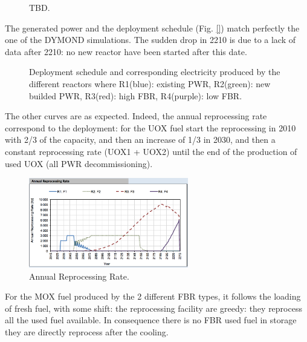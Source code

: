 \documentclass[12pt]{article}
\begin{document}
\begin{figure}[h!]
\centering
{}
\caption{TBD.\label{fig:RessourceUsed} }
\end{figure}

The generated power and the deployment schedule
(Fig. \ref{})  match perfectly the one of the
DYMOND simulations. The sudden drop in 2210 is
due to a lack of data after 2210: no new reactor
have been started after this date.\\

\begin{figure}[h!]
\centering
{}
\caption{Deployment schedule and corresponding
electricity produced by the different reactors
where R1(blue): existing PWR, R2(green): new
builded PWR, R3(red): high FBR, R4(purple): low
FBR.\label{fig:deployment_bis} }
\end{figure}


The other curves are as expected. Indeed, the
annual reprocessing rate correspond to the
deployment:  for the UOX fuel start the
reprocessing in 2010 with 2/3 of the capacity, and
then an increase of 1/3 in 2030, and then a
constant reprocessing rate (UOX1 + UOX2) until the
end of the production of used UOX (all PWR
decommissioning).


\begin{figure}[h!]
\centering
\includegraphics[width=0.62\textwidth]	{img/AnnualReprocessingRate_1}
\caption{Annual Reprocessing Rate.}
\label{fig:reprocessing_1}
\end{figure}


For the MOX fuel produced by the 2 different FBR
types, it follows the loading of fresh fuel, with
some shift: the reprocessing facility are greedy:
they reprocess all the used fuel available. In
consequence there is no FBR used fuel in storage
they are directly reprocess after the cooling.
\end{document}
